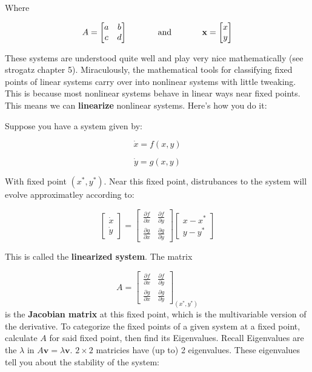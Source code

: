 Where

\[
A = 
\begin{bmatrix}
a & b \\
c & d
\end{bmatrix}
\hspace{0.5in}\text{and} \hspace{0.5in} \mathbf{x} = \begin{bmatrix} x \\ y \end{bmatrix}
\]

These systems are understood quite well and play very nice
mathematically (see strogatz chapter 5). Miraculously, the mathematical
tools for classifying fixed points of linear systems carry over into
nonlinear systems with little tweaking. This is because most nonlinear
systems behave in linear ways near fixed points. This means we can
\textbf{linearize} nonlinear systems. Here's how you do it:

Suppose you have a system given by:

\[
\dot{x} = f(x,y)
\]

\[
\dot{y} = g(x,y)
\]

With fixed point \((x^*,y^*)\). Near this fixed point, distrubances to
the system will evolve approximatley according to:

\[
\begin{bmatrix} \dot{x} \\ \dot{y} \end{bmatrix} = \begin{bmatrix} \frac{\partial f}{\partial x} & \frac{\partial f}{\partial y} \\ \frac{\partial g}{\partial x} & \frac{\partial g}{\partial y}\end{bmatrix} \begin{bmatrix}x - x^* \\ y - y^*\end{bmatrix}
\]

This is called the \textbf{linearized system}. The matrix

\[
A = \begin{bmatrix} \frac{\partial f}{\partial x} & \frac{\partial f}{\partial y} \\ \frac{\partial g}{\partial x} & \frac{\partial g}{\partial y}\end{bmatrix}_{(x^*,y^*)}
\] is the \textbf{Jacobian matrix} at this fixed point, which is the
multivariable version of the derivative. To categorize the fixed points
of a given system at a fixed point, calculate \(A\) for said fixed
point, then find its Eigenvalues. Recall Eigenvalues are the \(\lambda\)
in \(A\mathbf{v} = \lambda \mathbf{v}\). \(2\times2\) matricies have (up
to) 2 eigenvalues. These eigenvalues tell you about the stability of the
system:

